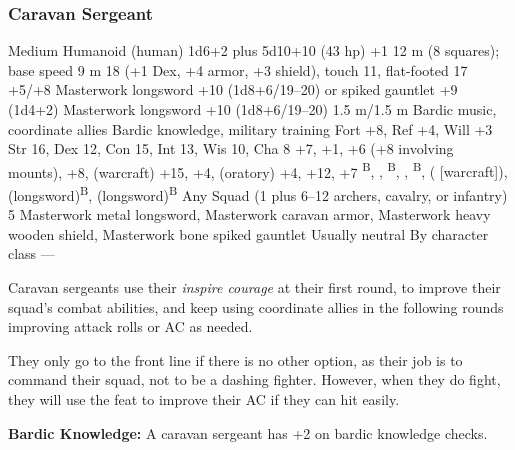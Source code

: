 \subsubsection{Caravan Sergeant}
\begin{MonsterStats}
{Medium Humanoid (human)}
{1d6+2 plus 5d10+10 (43 hp)}
{+1}
{12 m (8 squares); base speed 9 m}
{18 (+1 Dex, +4 armor, +3 shield), touch 11, flat-footed 17}
{+5/+8}
{Masterwork longsword +10 (1d8+6/19--20) or spiked gauntlet +9 (1d4+2)}
{Masterwork longsword +10 (1d8+6/19--20)}
{1.5 m/1.5 m}
{Bardic music, coordinate allies}
{Bardic knowledge, military training}
{Fort +8, Ref +4, Will +3}
{Str 16, Dex 12, Con 15, Int 13, Wis 10, Cha 8}
{
     +7,
     +1,
     +6 (+8 involving mounts),
     +8,
     (warcraft) +15,
     +4,
     (oratory) +4,
     +12,
     +7
}
{
    \textsuperscript{B},
    ,
		\textsuperscript{B},
    ,
    \textsuperscript{B},
     ( [warcraft]),
     (longsword)\textsuperscript{B},
     (longsword)\textsuperscript{B}
}
{Any}
{Squad (1 plus 6--12 archers, cavalry, or infantry)}
{5}
{
    Masterwork metal longsword,
    Masterwork caravan armor,
    Masterwork heavy wooden shield,
    Masterwork bone spiked gauntlet
}
{Usually neutral}
{By character class}
{---}
\end{MonsterStats}


Caravan sergeants use their \emph{inspire courage} at their first round, to improve their squad's combat abilities, and keep using coordinate allies in the following rounds improving attack rolls or AC as needed.

They only go to the front line if there is no other option, as their job is to command their squad, not to be a dashing fighter. However, when they do fight, they will use the  feat to improve their AC if they can hit easily.

\textbf{Bardic Knowledge:} A caravan sergeant has +2 on bardic knowledge checks.

